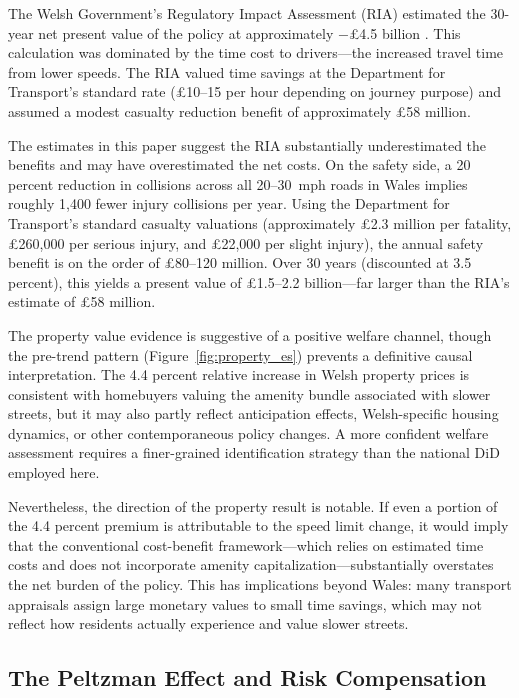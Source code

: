 \documentclass[12pt]{article}
\begin{document}
The Welsh Government's Regulatory Impact Assessment (RIA) estimated the 30-year net present value of the policy at approximately $-$\pounds 4.5 billion \citep{welshgov2022}. This calculation was dominated by the time cost to drivers---the increased travel time from lower speeds. The RIA valued time savings at the Department for Transport's standard rate (\pounds 10--15 per hour depending on journey purpose) and assumed a modest casualty reduction benefit of approximately \pounds 58 million.

The estimates in this paper suggest the RIA substantially underestimated the benefits and may have overestimated the net costs. On the safety side, a 20 percent reduction in collisions across all 20--30~mph roads in Wales implies roughly 1,400 fewer injury collisions per year. Using the Department for Transport's standard casualty valuations (approximately \pounds 2.3 million per fatality, \pounds 260,000 per serious injury, and \pounds 22,000 per slight injury), the annual safety benefit is on the order of \pounds 80--120 million. Over 30 years (discounted at 3.5 percent), this yields a present value of \pounds 1.5--2.2 billion---far larger than the RIA's estimate of \pounds 58 million.

The property value evidence is suggestive of a positive welfare channel, though the pre-trend pattern (Figure~\ref{fig:property_es}) prevents a definitive causal interpretation. The 4.4 percent relative increase in Welsh property prices is consistent with homebuyers valuing the amenity bundle associated with slower streets, but it may also partly reflect anticipation effects, Welsh-specific housing dynamics, or other contemporaneous policy changes. A more confident welfare assessment requires a finer-grained identification strategy than the national DiD employed here.

Nevertheless, the direction of the property result is notable. If even a portion of the 4.4 percent premium is attributable to the speed limit change, it would imply that the conventional cost-benefit framework---which relies on estimated time costs and does not incorporate amenity capitalization---substantially overstates the net burden of the policy. This has implications beyond Wales: many transport appraisals assign large monetary values to small time savings, which may not reflect how residents actually experience and value slower streets.

\subsection{The Peltzman Effect and Risk Compensation}
\end{document}
